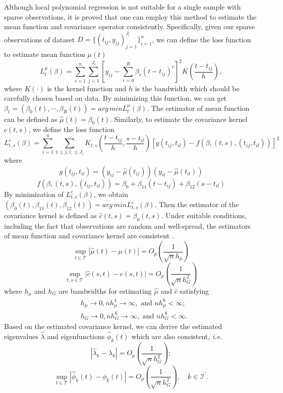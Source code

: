 \documentclass{article}
\begin{document}
Although local polynomial regression is not suitable for a single sample with sparse observations, 
it is proved that one can employ this method to estimate the mean function and covariance operator consistently.
Specifically, given our sparse observations of dataset $D=\{(t_{ij},y_{ij})_{j=1}^{J_i}\}_{i=1}^n
$,
we can define the loss function to estimate mean function $\mu(t)$
$$
L_t^\mu(\beta)=\sum_{i=1}^n\sum_{j=1}^{J_i}\left[y_{ij}-\sum_{r=0}^R \beta_r\left(t-t_{ij}\right)^r\right]^2 K\left(\frac{t-t_{ij}}{h}\right),
$$
where $K(\cdot)$ is the kernel function and $h$ is the bandwidth which should be carefully chosen based on data.
By minimizing this function, we can get
$\beta_t=(\beta_0(t), \cdots, \beta_R(t))=arg\,min L_t^\mu(\beta)$. The estimator of mean function can be defined as $\hat{\mu}(t)=\beta_0(t)$.
Similarly, to estimate the covariance kernel $c(t,s)$, we define the loss function 
$$
L^c_{t,s}(\beta)=\sum_{i=1}^n \sum_{1\leq j, l, \leq J_i} K_{t,s}(\frac{t-t_{ij}}{h}, \frac{s-t_{il}}{h}) \left[ g(t_{ij},t_{il})-f\left(\beta,(t,s),(t_{ij},t_{il})\right) \right]^2
$$
where
$$
g(t_{ij},t_{il})=(y_{ij}-\hat{\mu}(t_{ij}))(y_{il}-\hat{\mu}(t_{il}))
$$
$$
f\left(\beta,(t,s),(t_{ij},t_{il})\right)=\beta_0 + \beta_{11}(t-t_{ij})+\beta_{12}(s-t_{il})
$$
By minimization of $L_{t,s}^c(\beta)$, we obtain $(\beta_0(t),\beta_{11}(t),\beta_{12}(t))=arg\,min L_{t,s}^c(\beta)$. Then the estimator of the covariance kernel is defined as $\hat{c}(t,s)=\beta_0(t,s)$.
Under suitable conditions, including the fact that observations are random and well-spread, the estimators of mean function and covariance kernel are consistent \cite{yao2005functional} .
$$
\sup _{t \in \mathcal{T}}|\hat{\mu}(t)-\mu(t)|=O_p\left(\frac{1}{\sqrt{n} h_\mu}\right)
$$
$$
\sup _{t, s \in \mathcal{T}}|\hat{c}(s, t)-c(s, t)|=O_p\left(\frac{1}{\sqrt{n} h_G^2}\right)
$$
where $h_\mu$ and $h_G$ are bandwidths for estimating $\hat \mu$ and $\hat c$ satisfying
$$
\begin{aligned}
& h_\mu \rightarrow 0, n h_\mu^4 \rightarrow \infty, \text { and } n h_\mu^6<\infty; \\
& h_G \rightarrow 0, n h_G^6 \rightarrow \infty, \text { and } n h_G^8<\infty.
\end{aligned}
$$
Based on the estimated covariance kernel, we can derive the estimated  eigenvalues $\hat \lambda$ and eigenfunctions $\hat{\phi}_k(t)$ which are also consistent, \textit{i.e.}
$$
\left|\hat{\lambda}_k-\lambda_k\right|=O_p\left(\frac{1}{\sqrt{n} h_G^2}\right);
$$
$$
\sup _{t \in \mathcal{T}}\left|\hat{\phi}_k(t)-\phi_k(t)\right|=O_p\left(\frac{1}{\sqrt{n} h_G^2}\right), \quad k \in \mathcal{I}^{\prime}.
$$
\end{document}
